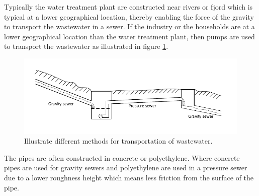 Typically the water treatment plant are constructed near rivers or fjord which is typical at a lower geographical location, thereby enabling the force of the gravity to transport the wastewater in a sewer. If the industry or the households are at a lower geographical location than the water treatment plant, then pumps are used to transport the wastewater as illustrated in figure \ref{fig:Sewer_drawing}.
\begin{figure}[H]
\centering
\includegraphics[width=1\textwidth]{report/introduction/pictures/Sewer_drawing.pdf}
\caption{Illustrate different methods for transportation of wastewater.}
\label{fig:Sewer_drawing}
\end{figure}

The pipes are often constructed in concrete or polyethylene. Where concrete pipes are used for gravity sewers and polyethylene are used in a pressure sewer due to a lower roughness height which means less friction from the surface of the pipe. 